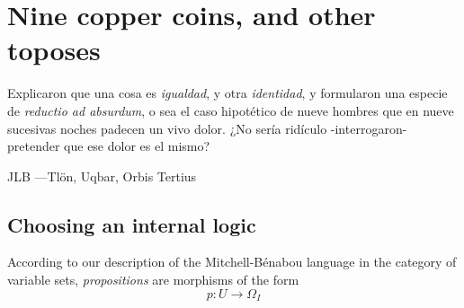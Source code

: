 \section{Nine copper coins, and other toposes}\label{sec_coins}
\epigraph{
	Explicaron que una cosa es \emph{igualdad}, y otra \emph{identidad}, y formularon una especie de \emph{reductio ad absurdum}, o sea el caso hipotético de nueve hombres que en nueve sucesivas noches padecen un vivo dolor. ¿No sería ridículo -interrogaron- pretender que ese dolor es el mismo?
}{JLB ---Tl\"on, Uqbar, Orbis Tertius}
\subsection{Choosing an internal logic}
According to our description of the Mitchell-Bénabou language in the category of variable sets, \emph{propositions} are morphisms of the form
\[p : U \to \Omega_I\]


